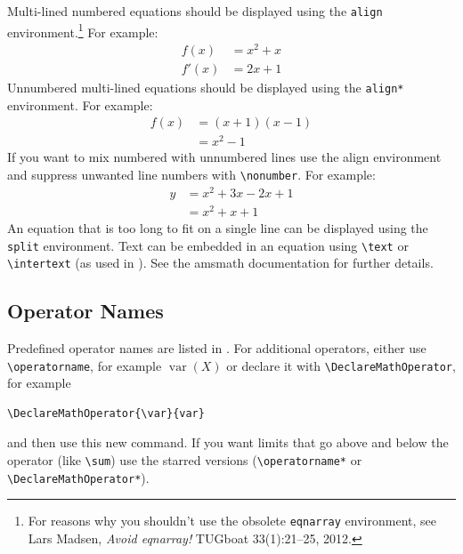 \documentclass[pmlr]{jmlr}%
\begin{document}
Multi-lined numbered equations should be displayed using the
\texttt{align} environment.\footnote{For reasons why you 
shouldn't use the obsolete \texttt{eqnarray} environment, see
Lars Madsen, \emph{Avoid eqnarray!} TUGboat 33(1):21--25, 2012.} For example:
\begin{align}
f(x) &= x^2 + x\label{eq:f}\\
f'(x) &= 2x + 1\label{eq:df}
\end{align}
Unnumbered multi-lined equations should be displayed using the
\texttt{align*} environment. For example:
\begin{align*}
f(x) &= (x+1)(x-1)\\
&= x^2 - 1
\end{align*}
If you want to mix numbered with unnumbered lines use the
align environment and suppress unwanted line numbers with
\verb|\nonumber|. For example:
\begin{align}
y &= x^2 + 3x - 2x + 1\nonumber\\
&= x^2 + x + 1\label{eq:y}
\end{align}
An equation that is too long to fit on a single line can be
displayed using the \texttt{split} environment. 
Text can be embedded in an equation using \verb|\text| or
\verb|\intertext| (as used in ).
See the \textsf{amsmath} documentation for further details.

\subsection{Operator Names}
\label{sec:op}

Predefined operator names are listed in .
For additional operators, either use \verb|\operatorname|,
for example $\operatorname{var}(X)$ or declare it with
\verb|\DeclareMathOperator|, for example
\begin{verbatim}
\DeclareMathOperator{\var}{var}
\end{verbatim}
and then use this new command. If you want limits that go above and
below the operator (like \verb|\sum|) use the starred versions
(\verb|\operatorname*| or \verb|\DeclareMathOperator*|).
\end{document}

